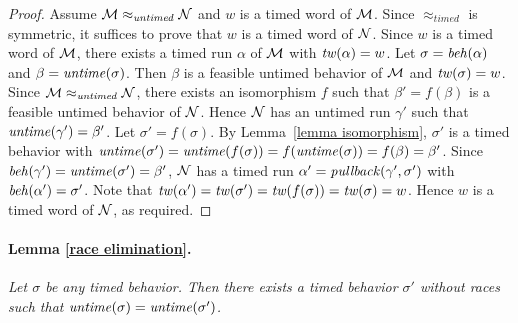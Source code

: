 \begin{proof}
Assume ${\mathcal M} \approx_{\mathit{untimed}} {\mathcal N}$ and $w$ is a timed word of ${\mathcal M}$.
Since $\approx_{\mathit{timed}}$ is symmetric, it suffices to prove that $w$ is a timed word of ${\mathcal N}$.
Since $w$ is a timed word of ${\mathcal M}$,
there exists a timed run $\alpha$ of ${\mathcal M}$ with $\mathit{tw}(\alpha) = w$. 
Let $\sigma = \mathit{beh}(\alpha)$ and $\beta = \mathit{untime}(\sigma)$. 
Then $\beta$ is a feasible untimed behavior of ${\mathcal M}$ and $\mathit{tw}(\sigma) = w$.
Since  ${\mathcal M} \approx_{\mathit{untimed}} {\mathcal N}$, there exists an isomorphism $f$ such that 
$\beta' = f(\beta)$ is a feasible untimed behavior of ${\mathcal N}$.
Hence ${\mathcal N}$ has an untimed run $\gamma'$ such that $\mathit{untime}(\gamma') = \beta'$.
Let $\sigma' = f(\sigma)$.
By Lemma~\ref{lemma isomorphism}, $\sigma'$ is a timed behavior with 
$\mathit{untime}(\sigma') = \mathit{untime}(f(\sigma)) = f(\mathit{untime}(\sigma)) = f(\beta) = \beta'$.
Since $\mathit{beh}(\gamma') = \mathit{untime}(\sigma') = \beta'$, ${\mathcal N}$ has a timed run $\alpha' = \mathit{pullback}(\gamma',\sigma')$ with
$\mathit{beh}(\alpha') = \sigma'$.
Note that $\mathit{tw}(\alpha') = \mathit{tw}(\sigma') = \mathit{tw}(f(\sigma)) = \mathit{tw}(\sigma) = w$.
Hence $w$ is a timed word of ${\mathcal N}$, as required.
\end{proof}

\paragraph{Lemma \ref{race elimination}.}
\emph{Let $\sigma$ be any timed behavior.
Then there exists a timed behavior $\sigma'$ without races such that $\mathit{untime}(\sigma)=\mathit{untime}(\sigma')$.}

